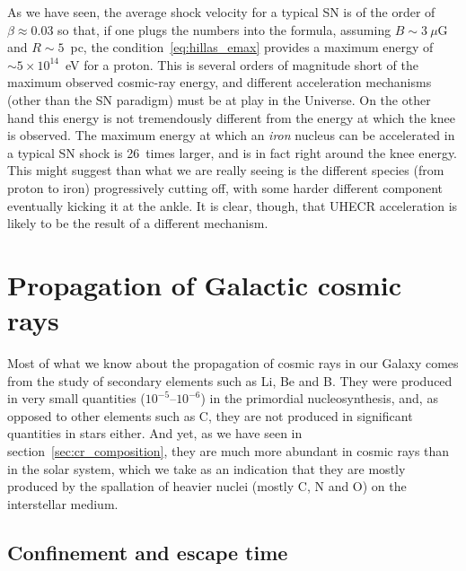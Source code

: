 As we have seen, the average shock velocity for a typical SN is of the order of
$\beta \approx 0.03$ so that, if one plugs the numbers into the formula, assuming
$B \sim 3~\mu$G and $R \sim 5$~pc, the condition~\eqref{eq:hillas_emax}
provides a maximum energy of $\sim 5 \times 10^{14}$~eV for a proton. This is several
orders of magnitude short of the maximum observed cosmic-ray energy, and different
acceleration mechanisms (other than the SN paradigm) must be at play in the Universe.
On the other hand this energy is not tremendously different from the energy at
which the knee is observed. The maximum energy at which an \emph{iron} nucleus can be
accelerated in a typical SN shock is 26~times larger, and is in fact right around
the knee energy. This might suggest than what we are really seeing is the different
species (from proton to iron) progressively cutting off, with some harder different
component eventually kicking it at the ankle. It is clear, though, that
UHECR acceleration is likely to be the result of a different mechanism.


\section{Propagation of Galactic cosmic rays}
\label{sec:cr_propagation}

Most of what we know about the propagation of cosmic rays in our Galaxy comes
from the study of secondary elements such as Li, Be and B. They were produced in very
small quantities ($10^{-5}$--$10^{-6}$) in the primordial nucleosynthesis, and, as
opposed to other elements such as C, they are not produced in significant quantities
in stars either. And yet, as we have seen in section~\ref{sec:cr_composition}, they are
much more abundant in cosmic rays than in the solar system, which we take as an
indication that they are mostly produced by the spallation of heavier nuclei
(mostly C, N and O) on the interstellar medium.


\subsection{Confinement and escape time}

